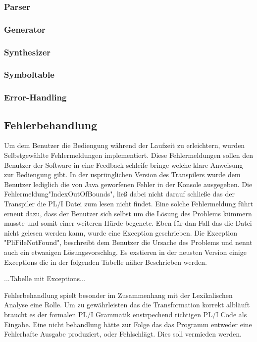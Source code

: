 \subsubsection{Parser}
\subsubsection{Generator}
\subsubsection{Synthesizer}
\subsubsection{Symboltable}
\subsubsection{Error-Handling}

\subsection{Fehlerbehandlung}
Um dem Benutzer die Bediengung während der Laufzeit zu erleichtern, wurden Selbstgewählte Fehlermeldungen implementiert. Diese Fehlermeldungen sollen den Benutzer der Software in eine Feedback schleife bringe welche klare Anweisung zur Bediengung gibt. In der usprünglichen Version des Transpilers wurde dem Benutzer lediglich die von Java geworfenen Fehler in der Konsole ausgegeben. Die Fehlermeldung"IndexOutOfBounds", ließ dabei nicht darauf schließe das der Transpiler die PL/I Datei zum lesen nicht findet. Eine solche Fehlermeldung führt erneut dazu, dass der Benutzer sich selbst um die Lösung des Problems kümmern musste und somit einer weiteren Hürde begenete.
Eben für dan Fall das die Datei nicht gelesen werden kann, wurde eine Exception geschrieben. Die Exception "PliFileNotFound", beschreibt dem Benutzer die Ursache des Problems und nennt auch ein etwaaigen Lösungsvorschlag. Es exstieren in der neusten Version einige Exceptions die in der folgenden Tabelle näher Beschrieben werden.

...Tabelle mit Exceptions...

Fehlerbehandlung spielt besonder im Zusammenhang mit der Lexikalischen Analyse eine Rolle. Um zu gewährleisten das die Transformation korrekt albläuft braucht es der formalen PL/I Grammatik enstrpechend richtigen PL/I Code als Eingabe. Eine nicht behandlung hätte zur Folge das das Programm entweder eine Fehlerhafte Ausgabe produziert, oder Fehlschlägt. Dies soll vermieden werden.

